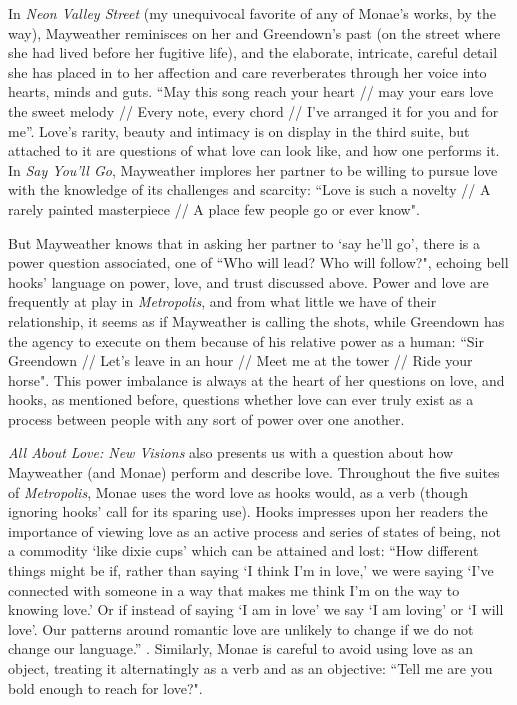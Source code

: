 \documentclass[a4paper, 11pt]{article} %
\begin{document}
In \emph{Neon Valley Street} (my unequivocal favorite of any of Monae's works, by the way), Mayweather reminisces on her and Greendown's past (on the street where she had lived before her fugitive life), and the elaborate, intricate, careful detail she has placed in to her affection and care reverberates through her voice into hearts, minds and guts.
``May this song reach your heart // may your ears love the sweet melody // Every note, every chord // I've arranged it for you and for me''\cite{neonvalleystreet}.
Love's rarity, beauty and intimacy is on display in the third suite, but attached to it are questions of what love can look like, and how one performs it.
In \emph{Say You'll Go}, Mayweather implores her partner to be willing to pursue love with the knowledge of its challenges and scarcity:
``Love is such a novelty // A rarely painted masterpiece // A place few people go or ever know"\cite{sayyouwillgo}.

But Mayweather knows that in asking her partner to `say he'll go', there is a power question associated, one of ``Who will lead? Who will follow?"\cite{sayyouwillgo}, echoing bell hooks' language on power, love, and trust discussed above\cite{newvisions}.
Power and love are frequently at play in \emph{Metropolis}, and from what little we have of their relationship, it seems as if Mayweather is calling the shots, while Greendown has the agency to execute on them because of his relative power as a human: ``Sir Greendown // Let's leave in an hour // Meet me at the tower // Ride your horse"\cite{greendown}.
This power imbalance is always at the heart of her questions on love, and hooks, as mentioned before, questions whether love can ever truly exist as a process between people with any sort of power over one another\cite{newvisions}.

\emph{All About Love: New Visions} also presents us with a question about how Mayweather (and Monae) perform and describe love.
Throughout the five suites of \emph{Metropolis}, Monae uses the word love as hooks would, as a verb (though ignoring hooks' call for its sparing use).
Hooks impresses upon her readers the importance of viewing love as an active process and series of states of being, not a commodity `like dixie cups' which can be attained and lost:
``How different things might be if, rather than saying `I think I'm in love,' we were saying `I've connected with someone in a way that makes me think I'm on the way to knowing love.' Or if instead of saying `I am in love' we say `I am loving' or `I will love'. Our patterns around romantic love are unlikely to change if we do not change our language.'' \cite{newvisions}.
Similarly, Monae is careful to avoid using love as an object, treating it alternatingly as a verb and as an objective: ``Tell me are you bold enough to reach for love?"\cite{manymoons}.
\end{document}
